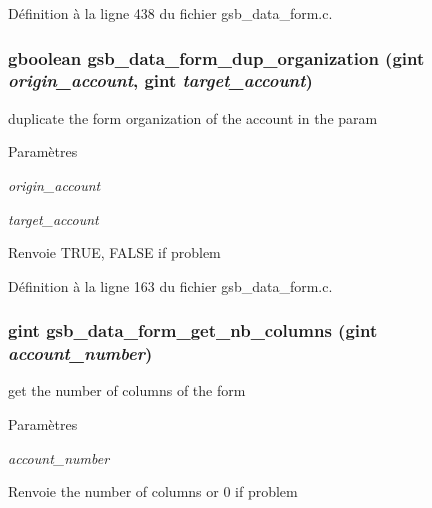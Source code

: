 Définition à la ligne 438 du fichier gsb\_\-data\_\-form.c.

\subsubsection[{gsb\_\-data\_\-form\_\-dup\_\-organization}]{\setlength{\rightskip}{0pt plus 5cm}gboolean gsb\_\-data\_\-form\_\-dup\_\-organization (gint {\em origin\_\-account}, \/  gint {\em target\_\-account})}\label{gsb__data__form_8h_a838ada33bfce85d6324f0ea409216103}
duplicate the form organization of the account in the param


\begin{DoxyParams}{Paramètres}
\item[{\em origin\_\-account}]\item[{\em target\_\-account}]\end{DoxyParams}
\begin{DoxyReturn}{Renvoie}
TRUE, FALSE if problem 
\end{DoxyReturn}


Définition à la ligne 163 du fichier gsb\_\-data\_\-form.c.

\subsubsection[{gsb\_\-data\_\-form\_\-get\_\-nb\_\-columns}]{\setlength{\rightskip}{0pt plus 5cm}gint gsb\_\-data\_\-form\_\-get\_\-nb\_\-columns (gint {\em account\_\-number})}\label{gsb__data__form_8h_a4bc1dd95bb028e836ef638b937e28116}
get the number of columns of the form


\begin{DoxyParams}{Paramètres}
\item[{\em account\_\-number}]\end{DoxyParams}
\begin{DoxyReturn}{Renvoie}
the number of columns or 0 if problem 
\end{DoxyReturn}


